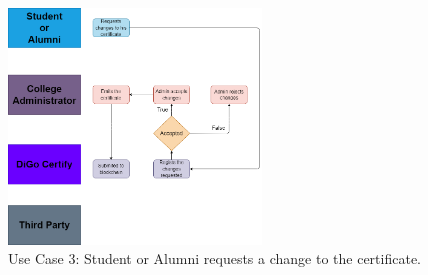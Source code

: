 \begin{figure}[H]
    \centering
    \includegraphics[width=0.6\textwidth, height=0.6\textheight, keepaspectratio]{./assets/certificate-update.drawio.png}
    \caption{Use Case 3: Student or Alumni requests a change to the certificate.}
    \label{fig:use-case-3}
\end{figure}

